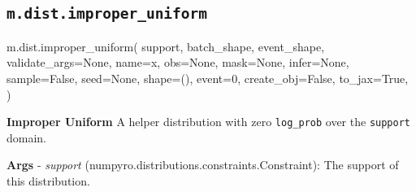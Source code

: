 \documentclass[
  letterpaper,
  DIV=11,
  numbers=noendperiod]{scrartcl}
\newenvironment{Shaded}{\begin{snugshade}}{\end{snugshade}}
\newcommand{\DecValTok}[1]{\textcolor[rgb]{0.68,0.00,0.00}{#1}}
\newcommand{\NormalTok}[1]{\textcolor[rgb]{0.00,0.23,0.31}{#1}}
\newcommand{\OperatorTok}[1]{\textcolor[rgb]{0.37,0.37,0.37}{#1}}
\newcommand{\StringTok}[1]{\textcolor[rgb]{0.13,0.47,0.30}{#1}}
\newcommand{\VariableTok}[1]{\textcolor[rgb]{0.07,0.07,0.07}{#1}}
\begin{document}
\subsection{\texorpdfstring{\texttt{m.dist.improper\_uniform}}{m.dist.improper\_uniform}}\label{improper_uniform}

\begin{Shaded}
\begin{Highlighting}[]
\NormalTok{m.dist.improper\_uniform(}
\NormalTok{    support,}
\NormalTok{    batch\_shape,}
\NormalTok{    event\_shape,}
\NormalTok{    validate\_args}\OperatorTok{=}\VariableTok{None}\NormalTok{,}
\NormalTok{    name}\OperatorTok{=}\StringTok{\textquotesingle{}x\textquotesingle{}}\NormalTok{,}
\NormalTok{    obs}\OperatorTok{=}\VariableTok{None}\NormalTok{,}
\NormalTok{    mask}\OperatorTok{=}\VariableTok{None}\NormalTok{,}
\NormalTok{    infer}\OperatorTok{=}\VariableTok{None}\NormalTok{,}
\NormalTok{    sample}\OperatorTok{=}\VariableTok{False}\NormalTok{,}
\NormalTok{    seed}\OperatorTok{=}\VariableTok{None}\NormalTok{,}
\NormalTok{    shape}\OperatorTok{=}\NormalTok{(),}
\NormalTok{    event}\OperatorTok{=}\DecValTok{0}\NormalTok{,}
\NormalTok{    create\_obj}\OperatorTok{=}\VariableTok{False}\NormalTok{,}
\NormalTok{    to\_jax}\OperatorTok{=}\VariableTok{True}\NormalTok{,}
\NormalTok{)}
\end{Highlighting}
\end{Shaded}

\textbf{Improper Uniform} A helper distribution with zero
\texttt{log\_prob} over the \texttt{support} domain.

\textbf{Args} - \emph{support}
(numpyro.distributions.constraints.Constraint): The support of this
distribution.
\end{document}
